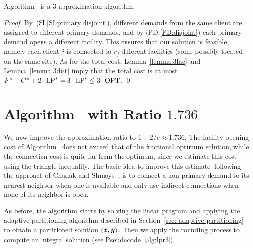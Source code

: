 \documentclass{llncs}
\begin{document}
\begin{theorem}
Algorithm~{\EGUP} is a $3$-approximation algorithm.
\end{theorem}

\begin{proof}
  By~(SI.\ref{SI:primary disjoint}), different
  demands from the same client are assigned to different
  primary demands, and by (PD.\ref{PD:disjoint}) each primary
  demand opens a different facility. This ensures that our
  solution is feasible, namely each client $j$ is connected
  to $r_j$ different facilities (some possibly located on
  the same site).  As for the total cost,
  Lemma~\ref{lemma:3fac} and Lemma~\ref{lemma:3dist} imply
  that the total cost is at most
  $F^\ast+C^\ast+2\cdot\mbox{\rm LP}^\ast = 3\cdot\mbox{\rm LP}^\ast \leq
  3\cdot\mbox{\rm OPT}$.
\qed
\end{proof}



\section{Algorithm~{\ECHS} with Ratio $1.736$}\label{sec: 1.736-approximation}

We now improve the approximation ratio to $1+2/e \approx
1.736$.  The facility opening cost of
Algorithm~{\EGUP} does not exceed that of the fractional optimum
solution, while the connection cost is quite far from the optimum,
since we estimate this cost using the
triangle inequality. The basic idea to improve this estimate,
following the approach of Chudak and
Shmoys~\cite{ChudakS04}, is to connect a non-primary demand to its
nearest neighbor when one is available and only use indirect connections
when none of its neighbor is open.


  As before, the algorithm starts by
solving the linear program and applying the adaptive partitioning
algorithm described in Section~\ref{sec: adaptive partitioning} to
obtain a partitioned solution $(\bar{\boldsymbol{x}}, \bar{\boldsymbol{y}})$. Then we apply the
rounding process to compute an integral solution (see
Pseudocode~\ref{alg:lpr3}).

\end{document}
